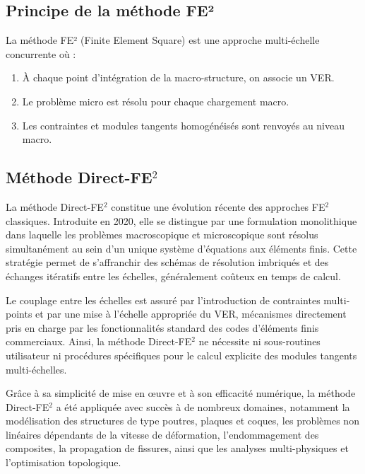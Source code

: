 \documentclass{rapportECL}
\begin{document}
\subsection{Principe de la méthode FE²}
\begin{center}
\begin{minipage}{0.9\textwidth}
\begin{framed}
\noindent La méthode FE² (Finite Element Square) est une approche multi-échelle concurrente où :
\begin{enumerate}
\item À chaque point d'intégration de la macro-structure, on associe un VER.
\item Le problème micro est résolu pour chaque chargement macro.
\item Les contraintes et modules tangents homogénéisés sont renvoyés au niveau macro.
\end{enumerate}
\end{framed}
\end{minipage}
\end{center}

\vspace{20pt}

\subsection{Méthode Direct-FE$^2$}
La méthode Direct-FE$^2$ constitue une évolution récente des approches FE$^2$ classiques. Introduite en 2020, elle se distingue par une formulation monolithique dans laquelle les problèmes macroscopique et microscopique sont résolus simultanément au sein d'un unique système d'équations aux éléments finis. Cette stratégie permet de s'affranchir des schémas de résolution imbriqués et des échanges itératifs entre les échelles, généralement coûteux en temps de calcul.

Le couplage entre les échelles est assuré par l'introduction de contraintes multi-points et par une mise à l'échelle appropriée du VER, mécanismes directement pris en charge par les fonctionnalités standard des codes d'éléments finis commerciaux. Ainsi, la méthode Direct-FE$^2$ ne nécessite ni sous-routines utilisateur ni procédures spécifiques pour le calcul explicite des modules tangents multi-échelles.

Grâce à sa simplicité de mise en œuvre et à son efficacité numérique, la méthode Direct-FE$^2$ a été appliquée avec succès à de nombreux domaines, notamment la modélisation des structures de type poutres, plaques et coques, les problèmes non linéaires dépendants de la vitesse de déformation, l'endommagement des composites, la propagation de fissures, ainsi que les analyses multi-physiques et l'optimisation topologique.
\end{document}
